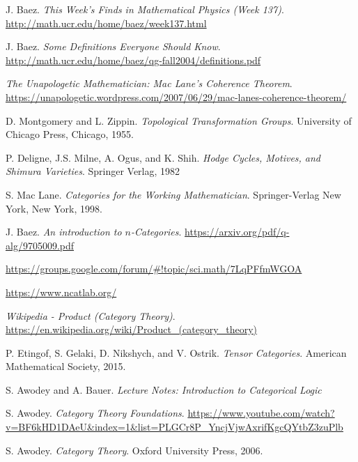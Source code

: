 \documentclass[a4paper]{report}
\theoremstyle{definition}
\theoremstyle{plain}
\theoremstyle{remark}
\begin{document}
\begin{thebibliography}{9}
   J. Baez.
    \textit{This Week's Finds in Mathematical Physics (Week 137)}.
    \url{http://math.ucr.edu/home/baez/week137.html}

   J. Baez.
    \textit{Some Definitions Everyone Should Know}.
    \url{http://math.ucr.edu/home/baez/qg-fall2004/definitions.pdf}

    \textit{The Unapologetic Mathematician: Mac Lane's Coherence Theorem}.
    \url{https://unapologetic.wordpress.com/2007/06/29/mac-lanes-coherence-theorem/}

   D. Montgomery and L. Zippin. 
    \textit{Topological Transformation Groups}.
    University of Chicago Press, Chicago, 1955.

   P. Deligne, J.S. Milne, A. Ogus, and K. Shih.
    \textit{Hodge Cycles, Motives, and Shimura Varieties}.
    Springer Verlag, 1982

   S. Mac Lane.
    \textit{Categories for the Working Mathematician}.
    Springer-Verlag New York, New York, 1998.

   J. Baez. 
    \textit{An introduction to $n$-Categories}.
    \url{https://arxiv.org/pdf/q-alg/9705009.pdf}

    \url{https://groups.google.com/forum/#!topic/sci.math/7LqPFfmWGOA}

    \url{https://www.ncatlab.org/}

    \textit{Wikipedia - Product (Category Theory)}.
    \url{https://en.wikipedia.org/wiki/Product\_(category\_theory)}

   P. Etingof, S. Gelaki, D. Nikshych, and V. Ostrik.
    \textit{Tensor Categories}.
    American Mathematical Society, 2015.

   S. Awodey and A. Bauer.
    \textit{Lecture Notes: Introduction to Categorical Logic}

   S. Awodey.
    \textit{Category Theory Foundations}.
    \url{https://www.youtube.com/watch?v=BF6kHD1DAeU&index=1&list=PLGCr8P\_YncjVjwAxrifKgcQYtbZ3zuPlb}

   S. Awodey.
    \textit{Category Theory}.
    Oxford University Press, 2006.


\end{thebibliography}
\end{document}
